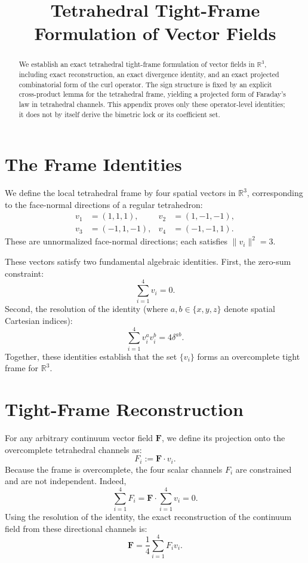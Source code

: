 \documentclass[11pt, letterpaper]{article}
\title{Tetrahedral Tight-Frame Formulation of Vector Fields}
\author{}
\date{}
\begin{document}
\maketitle

\begin{abstract}
We establish an exact tetrahedral tight-frame formulation of vector fields in \(\mathbb R^3\), including exact reconstruction, an exact divergence identity, and an exact projected combinatorial form of the curl operator. The sign structure is fixed by an explicit cross-product lemma for the tetrahedral frame, yielding a projected form of Faraday's law in tetrahedral channels. This appendix proves only these operator-level identities; it does not by itself derive the bimetric lock or its coefficient set.
\end{abstract}

\section{The Frame Identities}
We define the local tetrahedral frame by four spatial vectors in \(\mathbb{R}^3\), corresponding to the face-normal directions of a regular tetrahedron:
\begin{align*}
    v_1 &= (1, 1, 1), & v_2 &= (1, -1, -1), \\
    v_3 &= (-1, 1, -1), & v_4 &= (-1, -1, 1).
\end{align*}
These are unnormalized face-normal directions; each satisfies \(\|v_i\|^2 = 3\).

These vectors satisfy two fundamental algebraic identities. First, the zero-sum constraint:
\begin{equation}
    \sum_{i=1}^4 v_i = 0.
\end{equation}
Second, the resolution of the identity (where \(a, b \in \{x, y, z\}\) denote spatial Cartesian indices):
\begin{equation}
    \sum_{i=1}^4 v_i^a v_i^b = 4\delta^{ab}.
\end{equation}
Together, these identities establish that the set \(\{v_i\}\) forms an overcomplete tight frame for \(\mathbb{R}^3\).

\section{Tight-Frame Reconstruction}
For any arbitrary continuum vector field \(\mathbf{F}\), we define its projection onto the overcomplete tetrahedral channels as:
\begin{equation}
    F_i := \mathbf{F} \cdot v_i.
\end{equation}
Because the frame is overcomplete, the four scalar channels \(F_i\) are constrained and are not independent. Indeed,
\begin{equation}
    \sum_{i=1}^4 F_i
    =
    \mathbf{F} \cdot \sum_{i=1}^4 v_i
    =
    0.
\end{equation}
Using the resolution of the identity, the exact reconstruction of the continuum field from these directional channels is:
\begin{equation}
    \mathbf{F} = \frac{1}{4} \sum_{i=1}^4 F_i v_i.
\end{equation}
\end{document}
